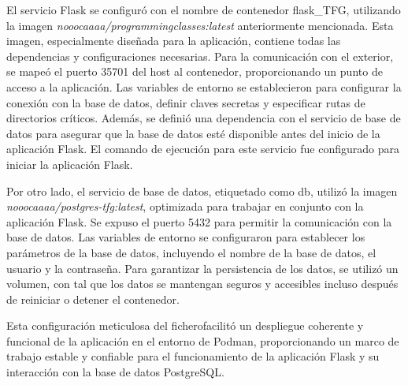El servicio Flask se configuró con el nombre de contenedor flask\_TFG, utilizando la imagen \textit{nooocaaaa/programmingclasses:latest} anteriormente mencionada. Esta imagen, especialmente diseñada para la aplicación, contiene todas las dependencias y configuraciones necesarias. Para la comunicación con el exterior, se mapeó el puerto 35701 del host al contenedor, proporcionando un punto de acceso a la aplicación. Las variables de entorno se establecieron para configurar la conexión con la base de datos, definir claves secretas y especificar rutas de directorios críticos. Además, se definió una dependencia con el servicio de base de datos para asegurar que la base de datos esté disponible antes del inicio de la aplicación Flask. El comando de ejecución para este servicio fue configurado para iniciar la aplicación Flask.

Por otro lado, el servicio de base de datos, etiquetado como db, utilizó la imagen \textit{nooocaaaa/postgres-tfg:latest}, optimizada para trabajar en conjunto con la aplicación Flask. Se expuso el puerto 5432 para permitir la comunicación con la base de datos. Las variables de entorno se configuraron para establecer los parámetros de la base de datos, incluyendo el nombre de la base de datos, el usuario y la contraseña. Para garantizar la persistencia de los datos, se utilizó un volumen, con tal que los datos se mantengan seguros y accesibles incluso después de reiniciar o detener el contenedor.

Esta configuración meticulosa del ficherofacilitó un despliegue coherente y funcional de la aplicación en el entorno de Podman, proporcionando un marco de trabajo estable y confiable para el funcionamiento de la aplicación Flask y su interacción con la base de datos PostgreSQL.
